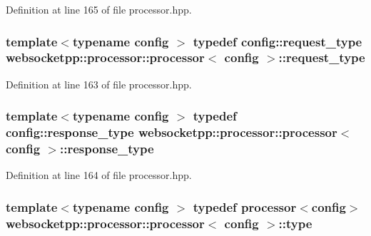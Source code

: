 Definition at line 165 of file processor.\+hpp.

\hypertarget{classwebsocketpp_1_1processor_1_1processor_ac3926102ce2422e6b40ccea41e764233}{}
\subsubsection[{request\+\_\+type}]{\setlength{\rightskip}{0pt plus 5cm}template$<$typename config $>$ typedef config\+::request\+\_\+type {\bf websocketpp\+::processor\+::processor}$<$ config $>$\+::{\bf request\+\_\+type}}\label{classwebsocketpp_1_1processor_1_1processor_ac3926102ce2422e6b40ccea41e764233}


Definition at line 163 of file processor.\+hpp.

\hypertarget{classwebsocketpp_1_1processor_1_1processor_aa8d088af1bdb838f1e86df6cf4395981}{}
\subsubsection[{response\+\_\+type}]{\setlength{\rightskip}{0pt plus 5cm}template$<$typename config $>$ typedef config\+::response\+\_\+type {\bf websocketpp\+::processor\+::processor}$<$ config $>$\+::{\bf response\+\_\+type}}\label{classwebsocketpp_1_1processor_1_1processor_aa8d088af1bdb838f1e86df6cf4395981}


Definition at line 164 of file processor.\+hpp.

\hypertarget{classwebsocketpp_1_1processor_1_1processor_ae897e7144ad7b9ece176d13ea5078ae2}{}
\subsubsection[{type}]{\setlength{\rightskip}{0pt plus 5cm}template$<$typename config $>$ typedef {\bf processor}$<$config$>$ {\bf websocketpp\+::processor\+::processor}$<$ config $>$\+::{\bf type}}\label{classwebsocketpp_1_1processor_1_1processor_ae897e7144ad7b9ece176d13ea5078ae2}


